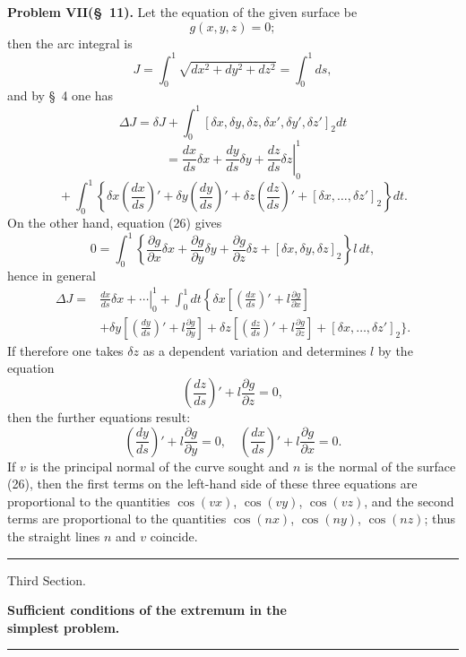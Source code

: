 \documentclass[11pt,a4paper,leqno]{article}
\begin{document}
\medskip
\noindent\textbf{Problem VII(\S~11).} Let the equation of the given surface be
\begin{equation}\tag{26}
g(x,y,z)=0;
\end{equation}
then the arc integral is
\[
J=\int_0^1\sqrt{dx^2+dy^2+dz^2}=\int_0^1ds,
\]
and by \S~4 one has
\[
\Delta J=\delta J+\int_0^1[\delta x,\delta y,\delta z,\delta x',\delta y',\delta z']_2dt
\]
\[
{}=\left.\frac{dx}{ds}\delta x+\frac{dy}{ds}\delta y+\frac{dz}{ds}\delta z\right|_0^1
\]
\[
{}+\int_0^1\left\{\delta x\left(\frac{dx}{ds}\right)'+\delta y\left(\frac{dy}{ds}\right)'+\delta z\left(\frac{dz}{ds}\right)'+[\delta x,\ldots,\delta z']_2\right\}dt.
\]
On the other hand, equation (26) gives
\[
0=\int_0^1\left\{\frac{\partial g}{\partial x}\delta x+\frac{\partial g}{\partial y}\delta y+\frac{\partial g}{\partial z}\delta z+[\delta x,\delta y,\delta z]_2\right\}l\,dt,
\]
hence in general
\[
\begin{split}
\Delta J={}&\left.\frac{dx}{ds}\delta x+\cdots\right|_0^1+\int_0^1dt\left\{\delta x\left[\left(\frac{dx}{ds}\right)'+l\frac{\partial g}{\partial x}\right]
\right.\\
&+\delta y\left[\left(\frac{dy}{ds}\right)'+l\frac{\partial g}{\partial y}\right]
+\delta z\left[\left(\frac{dz}{ds}\right)'+l\frac{\partial g}{\partial z}\right]
+[\delta x,\ldots,\delta z']_2\Bigg\}.
\end{split}
\]
If therefore one takes $\delta z$ as a dependent variation and determines $l$ by the equation
\[
\left(\frac{dz}{ds}\right)'+l\frac{\partial g}{\partial z}=0,
\]
then the further equations result:
\[
\left(\frac{dy}{ds}\right)'+l\frac{\partial g}{\partial y}=0,\quad
\left(\frac{dx}{ds}\right)'+l\frac{\partial g}{\partial x}=0.
\]
If $v$ is the principal normal of the curve sought and $n$ is the normal of the surface (26), then the first terms on the left-hand side of these three equations are proportional to the quantities $\cos(vx)$, $\cos(vy)$, $\cos(vz)$, and the second terms are proportional to the quantities $\cos(nx)$, $\cos(ny)$, $\cos(nz)$; thus the straight lines $n$ and $v$ coincide.

\begin{center}\rule{38mm}{0.4pt}\end{center}

\clearpage

\begin{center}
{\large Third Section.}\par
\vspace{0.8em}
{\Large\bfseries Sufficient conditions of the extremum in the\\ simplest problem.}\par
\vspace{1.0em}\rule{38mm}{0.4pt}
\end{center}
\end{document}
